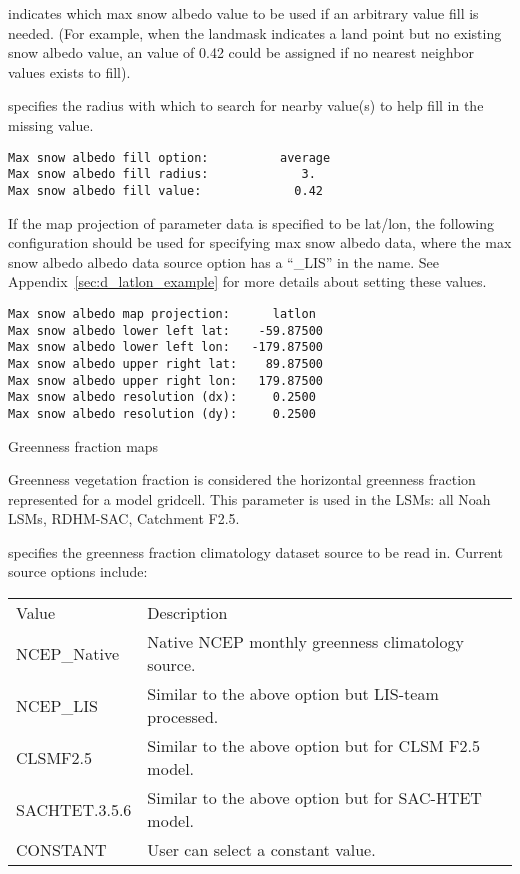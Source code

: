   indicates which max snow albedo
 value to be used if an arbitrary value fill is needed. 
 (For example, when the landmask indicates a land point but no existing 
 snow albedo value, an value of 0.42 could be assigned if 
 no nearest neighbor values exists to fill).

  specifies the radius with which
 to search for nearby value(s) to help fill in the missing value.
 

 \begin{Verbatim}[frame=single]
Max snow albedo fill option:          average
Max snow albedo fill radius:             3.
Max snow albedo fill value:             0.42
 \end{Verbatim}

 
 If the map projection of parameter data is specified to be lat/lon,
 the following configuration should be used for specifying max snow 
 albedo data, where the max snow albedo
 albedo data source option has a ``\_LIS'' in the name.
 See Appendix~\ref{sec:d_latlon_example} for more details about
 setting these values.
 

 \begin{Verbatim}[frame=single]
Max snow albedo map projection:      latlon
Max snow albedo lower left lat:    -59.87500
Max snow albedo lower left lon:   -179.87500
Max snow albedo upper right lat:    89.87500
Max snow albedo upper right lon:   179.87500
Max snow albedo resolution (dx):     0.2500
Max snow albedo resolution (dy):     0.2500
 \end{Verbatim}

 
 Greenness fraction maps

 Greenness vegetation fraction is considered the horizontal greenness
 fraction represented for a model gridcell. This parameter is used in the
 LSMs: all Noah LSMs, RDHM-SAC, Catchment F2.5. 

  specifies the greenness fraction
 climatology dataset source to be read in. Current source options include:

 \begin{tabular}{ll}
 Value         & Description    \\
 NCEP\_Native  &  Native NCEP monthly greenness climatology source. \\
 NCEP\_LIS     &  Similar to the above option but LIS-team processed. \\
 CLSMF2.5      &  Similar to the above option but for CLSM F2.5 model. \\
 SACHTET.3.5.6 &  Similar to the above option but for SAC-HTET model. \\
 CONSTANT      &  User can select a constant value. \\
 \end{tabular}

